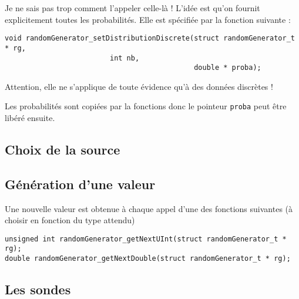    Je ne sais pas trop comment l'appeler celle-là ! L'idée est qu'on
fournit explicitement toutes les probabilités. Elle est spécifiée par
la fonction suivante :

\begin{verbatim}
void randomGenerator_setDistributionDiscrete(struct randomGenerator_t * rg,
					     int nb,
                                             double * proba);
\end{verbatim}

   Attention, elle ne s'applique de toute évidence qu'à des données
discrètes !

   Les probabilités sont copiées par la fonctions donc le pointeur
{\tt proba} peut être libéré ensuite.

%
\subsection{Choix de la source}

%
\subsection{Génération d'une valeur}


   Une nouvelle valeur est obtenue à chaque appel d'une des fonctions
suivantes (à choisir en fonction du type attendu)

\begin{verbatim}
unsigned int randomGenerator_getNextUInt(struct randomGenerator_t * rg);
double randomGenerator_getNextDouble(struct randomGenerator_t * rg);
\end{verbatim}

%
\subsection{Les sondes}

